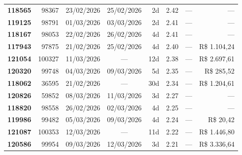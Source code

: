 \documentclass[a4paper,10pt]{article}
\begin{document}
\begin{center}
\begin{longtable}{>{\scriptsize}r>{\scriptsize}r>{\scriptsize}c>{\scriptsize}c>{\scriptsize}r>{\scriptsize}r>{\scriptsize}r>{\scriptsize}r}
\textcolor{anomyellow}{\textbf{118565}} & 98367 & 23/02/2026 & 25/02/2026 & 2d & \textcolor{anomyellow}{2.42} & --- & --- \\

\textcolor{anomyellow}{\textbf{119125}} & 98791 & 01/03/2026 & 03/03/2026 & 2d & \textcolor{anomyellow}{2.41} & --- & --- \\

\textcolor{anomyellow}{\textbf{118167}} & 98053 & 22/02/2026 & 26/02/2026 & 4d & \textcolor{anomyellow}{2.41} & --- & --- \\

\textcolor{anomyellow}{\textbf{117943}} & 97875 & 21/02/2026 & 25/02/2026 & 4d & \textcolor{anomyellow}{2.40} & --- & \textcolor{anomred}{R\$ 1.104,24} \\

\textcolor{anomyellow}{\textbf{121054}} & 100327 & 11/03/2026 & — & 12d & \textcolor{anomyellow}{2.38} & --- & \textcolor{anomred}{R\$ 2.697,61} \\

\textcolor{anomyellow}{\textbf{120320}} & 99748 & 04/03/2026 & 09/03/2026 & 5d & \textcolor{anomyellow}{2.35} & --- & \textcolor{anomred}{R\$ 285,52} \\

\textcolor{anomyellow}{\textbf{118062}} & 36595 & 21/02/2026 & — & 30d & \textcolor{anomyellow}{2.34} & --- & \textcolor{anomred}{R\$ 1.204,61} \\

\textcolor{anomyellow}{\textbf{120826}} & 59852 & 08/03/2026 & 11/03/2026 & 3d & \textcolor{anomyellow}{2.27} & --- & --- \\

\textcolor{anomyellow}{\textbf{118820}} & 98558 & 26/02/2026 & 02/03/2026 & 4d & \textcolor{anomyellow}{2.25} & --- & --- \\

\textcolor{anomyellow}{\textbf{119986}} & 99482 & 05/03/2026 & 09/03/2026 & 4d & \textcolor{anomyellow}{2.24} & --- & \textcolor{anomred}{R\$ 20,42} \\

\textcolor{anomyellow}{\textbf{121087}} & 100353 & 12/03/2026 & — & 11d & \textcolor{anomyellow}{2.22} & --- & \textcolor{anomred}{R\$ 1.446,80} \\

\textcolor{anomyellow}{\textbf{120586}} & 99954 & 09/03/2026 & 12/03/2026 & 3d & \textcolor{anomyellow}{2.21} & --- & \textcolor{anomred}{R\$ 3.336,64} \\


\end{longtable}
\end{center}
\end{document}
